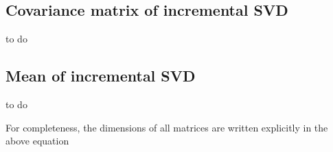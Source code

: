\subsection{Covariance matrix of incremental SVD}
to do

\subsection{Mean of incremental SVD}
to do

For completeness, the dimensions of all matrices are written explicitly in the above equation

